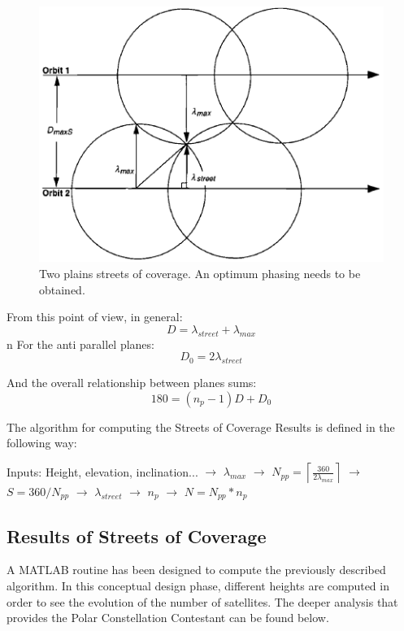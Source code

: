 \begin{figure}[H]
\begin{center}
\includegraphics[scale=0.7]{PolarOrbits/planeseps.png}
\caption[Two plains streets of coverage. An optimum phasing needs to be obtained]{Two plains streets of coverage. An optimum phasing needs to be obtained.\cite{ccar}}
\end{center}
\end{figure}

From this point of view, in general:
$$D = \lambda_{street} + \lambda_{max}$$
n
For the anti parallel planes:
$$D_{0} = 2\lambda_{street}$$

And the overall relationship between planes sums:
$$180 = (n_{p}-1)D + D_{0}$$

The algorithm for computing the Streets of Coverage Results is defined in the following way:

\begin{center}
Inputs: Height, elevation, inclination... 
$\rightarrow$
$\lambda_{max}$
$\rightarrow$
$N_{pp}=\left \lceil \frac{360}{2 \lambda_{max}}  \right \rceil$
$\rightarrow$
\newline
$S=360/N_{pp}$
$\rightarrow$
$\lambda_{street}$
$\rightarrow$
$n_{p}$
$\rightarrow$
$N=N_{pp}*n_{p}$
\end{center}

\subsection{Results of Streets of Coverage}
A MATLAB routine has been designed to compute the previously described algorithm. In this conceptual design phase, different heights are computed in order to see the evolution of the number of satellites. The deeper analysis that provides the Polar Constellation Contestant can be found below.

